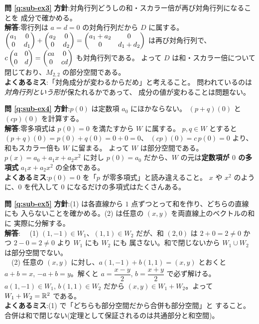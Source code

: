 \bigskip
\noindent\textbf{問 \ref{q:sub-ex3}}\quad
\textbf{方針}:対角行列どうしの和・スカラー倍が再び対角行列になることを
成分で確かめる。\\
\textbf{解答}:零行列は $a = d = 0$ の対角行列だから $D$ に属する。
$\begin{pmatrix}a_1 & 0 \\ 0 & d_1\end{pmatrix} + \begin{pmatrix}a_2 & 0 \\ 0 & d_2\end{pmatrix}
= \begin{pmatrix}a_1 + a_2 & 0 \\ 0 & d_1 + d_2\end{pmatrix}$ は再び対角行列で、
$c\begin{pmatrix}a & 0 \\ 0 & d\end{pmatrix} = \begin{pmatrix}ca & 0 \\ 0 & cd\end{pmatrix}$ も対角行列である。
よって $D$ は和・スカラー倍について閉じており、$M_{2,2}$ の部分空間である。\\
\textbf{よくあるミス}:「対角成分が変わるからだめ」と考えること。
問われているのは\emph{対角行列という形}が保たれるかであって、
成分の値が変わることは問題ない。

\bigskip
\noindent\textbf{問 \ref{q:sub-ex4}}\quad
\textbf{方針}:$p(0)$ は定数項 $a_0$ にほかならない。
$(p + q)(0)$ と $(cp)(0)$ を計算する。\\
\textbf{解答}:零多項式は $p(0) = 0$ を満たすから $W$ に属する。
$p, q \in W$ とすると $(p + q)(0) = p(0) + q(0) = 0 + 0 = 0$、
$(cp)(0) = c\,p(0) = 0$ より、和もスカラー倍も $W$ に留まる。
よって $W$ は部分空間である。$p(x) = a_0 + a_1 x + a_2 x^2$ に対し
$p(0) = a_0$ だから、$W$ の元は\textbf{定数項が $0$ の多項式}
$a_1 x + a_2 x^2$ の全体である。\\
\textbf{よくあるミス}:$p(0) = 0$ を「$p$ が零多項式」と読み違えること。
$x$ や $x^2$ のように、$0$ を代入して $0$ になるだけの多項式はたくさんある。

\bigskip
\noindent\textbf{問 \ref{q:sub-ex5}}\quad
\textbf{方針}:(1) は各直線から $1$ 点ずつとって和を作り、どちらの直線にも
入らないことを確かめる。(2) は任意の $(x, y)$ を両直線上のベクトルの和に
実際に分解する。\\
\textbf{解答}:
　(1) $(1, -1) \in W_1$、$(1, 1) \in W_2$ だが、和 $(2, 0)$ は
$2 + 0 = 2 \neq 0$ かつ $2 - 0 = 2 \neq 0$ より $W_1$ にも $W_2$ にも
属さない。和で閉じないから $W_1 \cup W_2$ は部分空間でない。\\
　(2) 任意の $(x, y)$ に対し、$a(1, -1) + b(1, 1) = (x, y)$ とおくと
$a + b = x$, $-a + b = y$。解くと $a = \dfrac{x - y}{2}$,
$b = \dfrac{x + y}{2}$ で必ず解ける。$a(1, -1) \in W_1$,
$b(1, 1) \in W_2$ だから $(x, y) \in W_1 + W_2$。よって
$W_1 + W_2 = \mathbb{R}^2$ である。\\
\textbf{よくあるミス}:(1) で「どちらも部分空間だから合併も部分空間」と
すること。合併は和で閉じない(定理として保証されるのは共通部分と和空間)。

